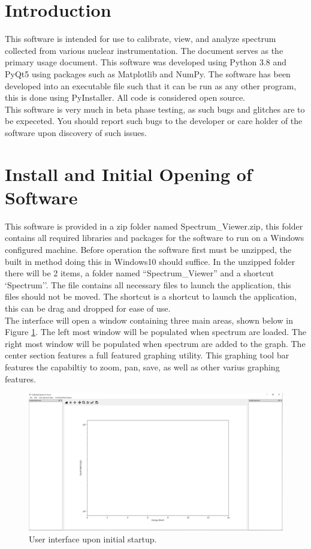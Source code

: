 \section{Introduction}
This software is intended for use to calibrate, view, and analyze spectrum collected from various nuclear instrumentation. The document serves as the primary usage document. This software was developed using Python 3.8 and PyQt5 using packages such as Matplotlib and NumPy. The software has been developed into an executable file such that it can be run as any other program, this is done using PyInstaller. All code is considered open source. \\

This software is very much in beta phase testing, as such bugs and glitches are to be expeceted. You should report such bugs to the developer or care holder of the software upon discovery of such issues.

\section{Install and Initial Opening of Software}
This software is provided in a zip folder named Spectrum\_Viewer.zip, this folder contains all required libraries and packages for the software to run on a Windows configured machine. Before operation the software first must be unzipped, the built in method doing this in Windows10 should suffice. In the unzipped folder there will be 2 items, a folder named ``Spectrum\_Viewer'' and a shortcut `Spectrum''. The file contains all necessary files to launch the application, this files should not be moved. The shortcut is a shortcut to launch the application, this can be drag and dropped for ease of use. \\

The interface will open a window containing three main areas, shown below in Figure \ref{fig:opening}. The left most window will be populated when spectrum are loaded. The right most window will be populated when spectrum are added to the graph. The center section features a full featured graphing utility. This graphing tool bar features the capabiltiy to zoom, pan, save, as well as other varius graphing features.

\begin{figure}[h!]
	\centering
	\includegraphics[width=\linewidth]{Front_Panel.png}
	\caption{User interface upon initial startup.}
	\label{fig:opening}
\end{figure}

